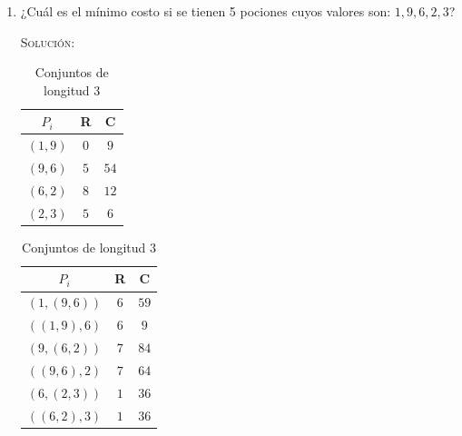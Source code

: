 \documentclass[letterpaper,11pt]{article}
\begin{document}
\begin{enumerate}
\begin{enumerate}
        \item ¿Cuál es el mínimo costo si se tienen 5 pociones cuyos valores son:
        $1, 9, 6, 2, 3$?

        \textsc{Solución:}
        \begin{table} [H]
            \parbox{.45\linewidth}{
            \centering
            \begin{tabular}{|c|c|c|}
            \hline
            $P_i$ & R & C \\
            \hline
            $(1,9)$ & $0$ & $9$ \\
            \hline
            $(9,6)$ & $5$ & $54$ \\
            \hline
            $(6,2)$ & $8$ & $12$ \\
            \hline
            $(2,3)$ & $5$ & $6$ \\
            \hline
            \end{tabular}
            \caption{Conjuntos de longitud $2$}
            }
            \hfill
            \parbox{.45\linewidth}{
            \centering
            \begin{tabular}{|c|c|c|}
            \hline
            $P_i$ & R & C \\
            \hline
            $(1, (9,6))$ & $6$ & $59$ \\
            \hline
            $((1,9), 6)$ & $6$ & $9$ \\
            \hline
            $(9, (6,2))$ & $7$ & $84$\\
            \hline
            $((9,6), 2)$ & $7$ & $64$ \\
            \hline
            $(6, (2,3))$ & $1$ & $36$\\
            \hline
            $((6,2), 3)$ & $1$ & $36$ \\
            \hline
            \end{tabular}
            \caption{Conjuntos de longitud $3$}
            }
        \end{table}


\end{enumerate}
\end{enumerate}
\end{document}
